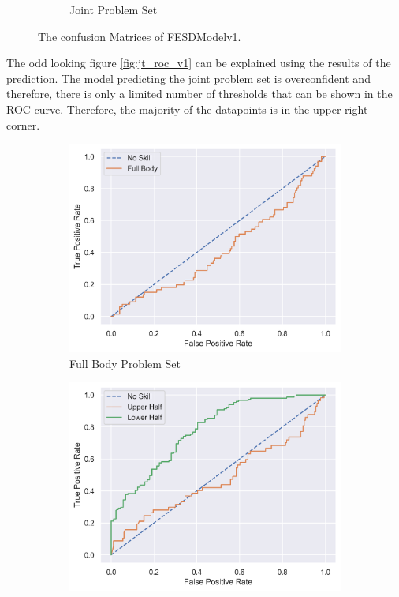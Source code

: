 \begin{figure}[!htbp]
\begin{subfigure}[b]{0.4\linewidth}
      \caption[]{Joint Problem Set}
      \label{fig:jt_conf_v1}
  \end{subfigure}
  \caption[Confusion Matrices of FESDModelv1]{The confusion Matrices of FESDModelv1.}
  \label{fig:conf_v1}
\end{figure}


The odd looking figure \ref{fig:jt_roc_v1} can be explained using the results of the prediction. The model predicting the joint problem set is overconfident and therefore, there is only a limited number of thresholds that can be shown in the ROC curve. Therefore, the majority of the datapoints is in the upper right corner.

\begin{figure}[htbp]
  \centering
  \begin{subfigure}[b]{0.4\linewidth}
      \centering
      \includegraphics[width=\textwidth]{figures/Results/v1/roc/fb.png}
      \caption[]{Full Body Problem Set}
      \label{fig:fb_roc_v1}
  \end{subfigure}
  \hfill
  \begin{subfigure}[b]{0.4\linewidth}
      \centering
      \includegraphics[width=\textwidth]{figures/Results/v1/roc/hb.png}

\end{subfigure}
\end{figure}
